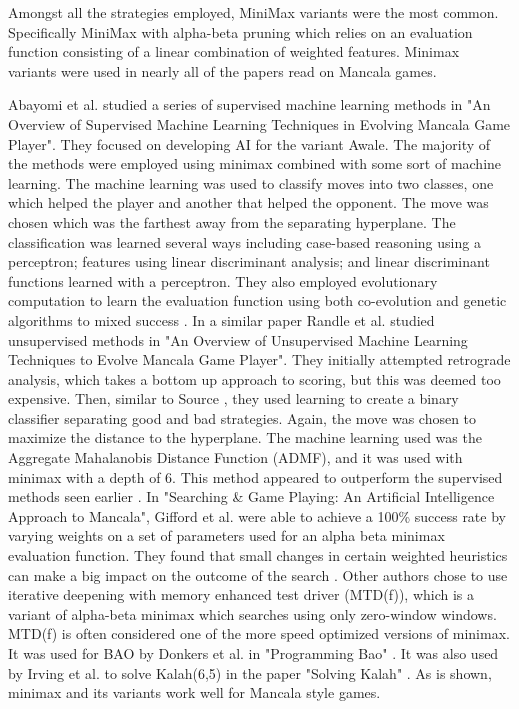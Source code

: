 \documentclass[]{article}
\begin{document}
Amongst all the strategies employed, MiniMax variants were the most common. Specifically MiniMax with alpha-beta pruning which relies on an evaluation function consisting of a linear combination of weighted features. Minimax variants were used in nearly all of the papers read on Mancala games. 

Abayomi et al. studied a series of supervised machine learning methods in "An Overview of Supervised Machine Learning Techniques in Evolving Mancala Game Player". They focused on developing AI for the variant Awale. The majority of the methods were employed using minimax combined with some sort of machine learning. The machine learning was used to classify moves into two classes, one which helped the player and another that helped the opponent. The move was chosen which was the farthest away from the separating hyperplane. The classification was learned several ways including case-based reasoning using a perceptron; features using linear discriminant analysis; and linear discriminant functions learned with a perceptron. They also employed evolutionary computation to learn the evaluation function using both co-evolution and genetic algorithms to mixed success \cite{abayomi2013overview}. In a similar paper Randle et al. studied unsupervised methods in "An Overview of Unsupervised Machine Learning Techniques to Evolve Mancala Game Player". They initially attempted retrograde analysis, which takes a bottom up approach to scoring, but this was deemed too expensive. Then, similar to Source \cite{abayomi2013overview}, they used learning to create a binary classifier separating good and bad strategies. Again, the move was chosen to maximize the distance to the hyperplane. The machine learning used was the Aggregate Mahalanobis Distance Function (ADMF), and it was used with minimax with a depth of 6. This method appeared to outperform the supervised methods seen earlier \cite{randle2013overview}. In "Searching \& Game Playing: An Artificial Intelligence Approach to Mancala", Gifford et al. were able to achieve a 100\% success rate by varying weights on a set of parameters used for an alpha beta minimax evaluation function. They found that small changes in certain weighted heuristics can make a big impact on the outcome of the search \cite{gifford2008searching}. Other authors chose to use iterative deepening with memory enhanced test driver (MTD(f)), which is a variant of alpha-beta minimax which searches using only zero-window windows. MTD(f) is often considered one of the more speed optimized versions of minimax. It was used for BAO by Donkers et al. in "Programming Bao" \cite{donkers2002programming}. It was also used by Irving et al. to solve Kalah(6,5) in the paper "Solving Kalah" \cite{irving2000solving}. As is shown, minimax and its variants work well for Mancala style games. 
\end{document}
